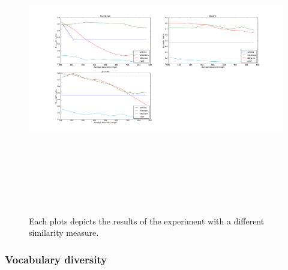 \begin{figure}[htbp]
  \begin{center}
    \includegraphics[height=5in, width=6in]{average_document_length}
    \caption{Each plots depicts the results of the experiment with a different similarity measure.}
    \label{DifferentLengthResults}
  \end{center}
\end{figure}

\subsubsection{Vocabulary diversity}

